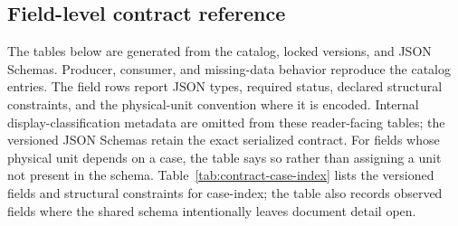 \begingroup\small\setlength{\tabcolsep}{3pt}
\subsection{Field-level contract reference}
\label{sec:data-contract-fields}
The tables below are generated from the catalog, locked versions, and JSON Schemas. Producer, consumer, and missing-data behavior reproduce the catalog entries. The field rows report JSON types, required status, declared structural constraints, and the physical-unit convention where it is encoded. Internal display-classification metadata are omitted from these reader-facing tables; the versioned JSON Schemas retain the exact serialized contract. For fields whose physical unit depends on a case, the table says so rather than assigning a unit not present in the schema.
Table~\ref{tab:contract-case-index} lists the versioned fields and structural constraints for case-index; the table also records observed fields where the shared schema intentionally leaves document detail open.
